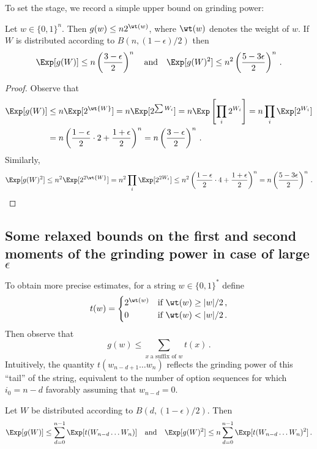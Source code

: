 
To set the stage, we record a simple upper bound on grinding power:
\begin{proposition}\label{prop:praos-moments-simple}
  Let $w \in \{0,1\}^n$. Then $g(w) \leq n 2^{\wt(w)}$, where $\wt(w)$ denotes the weight of $w$. If $W$ is distributed according to $B(n,(1 - \epsilon)/2)$ then
  \[
    \Exp[g(W)] \leq n \left(\frac{3 - \epsilon}{2}\right)^n \quad\text{and}\quad\Exp[g(W)^2] \leq n^2\left(\frac{5 - 3\epsilon}{2}\right)^n\,.
  \]
\end{proposition}

\begin{proof}
  Observe that
  \begin{align*}
    \Exp[g(W)] 
    &\leq n\Exp[2^{\wt{W}}] 
    = n\Exp[2^{\sum W_i}] 
    = n\Exp\left[\prod_i 2^{W_i}\right] 
    = n\prod_i \Exp[2^{W_i}] \\
    &= n \left( \frac{1-\epsilon}{2} \cdot 2 + \frac{1 + \epsilon}{2}\right)^n 
    = n \left(\frac{3 - \epsilon}{2}\right)^n\,.
  \end{align*}
    Similarly,
  \[
    \Exp[g(W)^2] \leq n^2 \Exp[2^{2\wt{W}}] = n^2\prod_i \Exp[2^{2W_i}] \leq n^2\left( \frac{1-\epsilon}{2} \cdot 4 + \frac{1 + \epsilon}{2}\right)^n = n \left(\frac{5 - 3\epsilon}{2}\right)^n\,.\qedhere
  \]
\end{proof}

\subsection{Some relaxed bounds on the first and second moments of the grinding power in case of \texorpdfstring{large $\epsilon$}{highly-biased binomial distributions}}
To obtain more precise estimates, for a string $w \in \{0,1\}^*$ define
\[
  t(w) = \begin{cases}
    2^{\wt(w)} & \text{if $\wt(w) \geq |w|/2$\,,}\\
    0 & \text{if $\wt(w) < |w|/2$\,.}
  \end{cases}
\]
Then observe that
\begin{equation}\label{eq:g-decomposition}
  g(w) \leq \sum_{x\; \text{a suffix of $w$}} t(x)\,.
\end{equation}
Intuitively, the quantity $t(w_{n-d+1} \ldots w_n)$ reflects the grinding power of this ``tail'' of the string, equivalent to the number of option sequences for which $i_0 = n-d$ favorably assuming that $w_{n-d} = 0$.
\begin{proposition}\label{prop:moments-general}
  Let $W$ be distributed according to $B(d,(1 - \epsilon)/2)$. Then
  \[
    \Exp[g(W)] \leq \sum_{d = 0}^{n-1} \Exp[t(W_{n-d} \ldots W_n)] \quad \text{and}\quad \Exp[g(W)^2] \leq n \sum_{d = 0}^{n-1} \Exp[t(W_{n-d} \ldots W_n)^2]\,.
  \]
\end{proposition}

